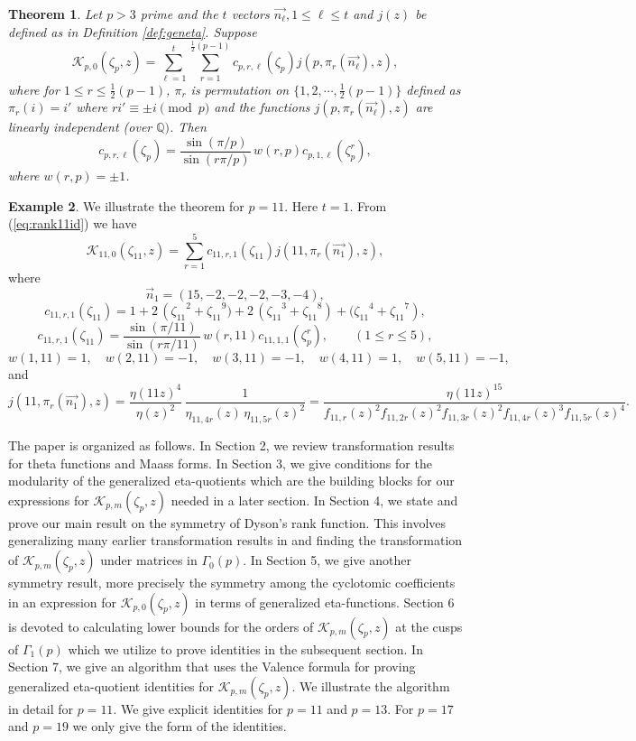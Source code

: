 \documentclass[12pt]{amsart}
\newtheorem{theorem}{Theorem}[section]
\theoremstyle{definition}
\newtheorem{example}[theorem]{Example}
\theoremstyle{remark}
\numberwithin{equation}{section}
\newcommand\eqn[1]{(\ref{eq:#1})}
\newcommand\refdef[1]{\ref{def:#1}}
\begin{document}
\begin{theorem}
\label{thm:Kp0sym}
Let $p>3$ prime and the $t$ vectors $\overrightarrow{n_{\ell}}, 1\leq \ell \leq t$ and $j(z)$ be defined as in Definition \refdef{geneta}. Suppose
$$
\mathcal{K}_{p,0}(\zeta_p,z)
=\sum_{{\ell}=1}^t\sum_{r=1}^{\frac{1}{2}(p-1)}c_{p,r,{\ell}}(\zeta_p)
         j(p,\pi_r(\overrightarrow{n_{\ell}}),z),
$$ 
where for $1\leq r \leq \frac{1}{2}(p-1)$, 
$\pi_r$ is permutation on $\{1,2,\cdots,\frac{1}{2}(p-1)\}$ defined as $\pi_r(i)=i'$ 
where $ri'\equiv \pm i \pmod{p}$ and the functions 
$j(p,\pi_r(\overrightarrow{n_{\ell}}),z)$ are linearly independent (over $\mathbb{Q})$. 
Then
$$
c_{p,r,\ell}(\zeta_p)=\frac{\sin(\pi/p)}{\sin(r\pi/p)}\,w(r,p)c_{p,1,\ell}(\zeta_p^r),
$$ 
where $w(r,p)=\pm 1$. 
\end{theorem}
\begin{example}
\label{ex:Kp0symeg}
We illustrate the theorem for $p=11$. Here $t=1$. From \eqn{rank11id} we have
$$
\mathcal{K}_{11,0}(\zeta_{11},z)
=\sum_{r=1}^{5}c_{11,r,1}(\zeta_{11})
         j(11,\pi_r(\overrightarrow{n_{1}}),z),
$$
where
$$
\vec{n}_1 = (15, -2,-2 ,-2,-3,-4),
$$
$$
c_{11,r,1}(\zeta_{11}) 
= 1+2\,\left({\zeta_{11}}^{2}+{\zeta_{11}}^{9})
  +2\,({\zeta_{11}}^{3}+{\zeta_{11}}^{8})
   +({\zeta_{11}}^{4}+{\zeta_{11}}^{7}\right),
$$
$$
c_{11,r,1}(\zeta_{11})=\frac{\sin(\pi/11)}{\sin(r\pi/11)}\,w(r,11)
                        c_{11,1,1}(\zeta_p^r),\qquad (1 \le r \le 5),
$$ 
$$
w(1,11)=1, \quad
w(2,11)=-1, \quad
w(3,11)=-1, \quad
w(4,11)=1, \quad
w(5,11)=-1,
$$
and
$$
j(11,\pi_r(\overrightarrow{n_{1}}),z)
= \frac{\eta(11z)^4}{\eta(z)^2} \, 
\frac{1}{\eta_{11,4r}(z)\,\eta_{11,5r}(z)^2}=
\frac{\eta(11z)^{15}}
{f_{11,r}(z)^2 
f_{11,2r}(z)^2 
f_{11,3r}(z)^2 
f_{11,4r}(z)^3 
f_{11,5r}(z)^4 }.
$$
\end{example}

The paper is organized as follows. In Section 2, we review transformation  
results for theta functions and Maass forms. In Section 3, we give conditions 
for 
the modularity of the generalized eta-quotients which are the building blocks 
for our 
expressions for $\mathcal{K}_{p,m}(\zeta_{p},z)$ needed in a later section. 
In Section 4, we state and prove our main result on the symmetry of Dyson's 
rank function. This involves generalizing many earlier transformation results 
in \cite{Ga19a} and finding the transformation of 
$\mathcal{K}_{p,m}(\zeta_{p},z)$ under matrices in $\Gamma_0(p)$. In 
Section 5, we give another symmetry result, more precisely the symmetry 
among the cyclotomic coefficients in an expression for 
$\mathcal{K}_{p,0}(\zeta_{p},z)$ in terms of generalized eta-functions.  
Section 6 is devoted to calculating lower bounds for the orders of 
$\mathcal{K}_{p,m}(\zeta_{p},z)$ at the cusps of $\Gamma_1(p)$ which we 
utilize to prove identities in the subsequent section. 
In Section 7, we give an algorithm that uses the Valence formula
for proving generalized eta-quotient identities
for $\mathcal{K}_{p,m}(\zeta_{p},z)$. We illustrate the algorithm in
detail for $p=11$. We give explicit identities for $p=11$ and $p=13$.
For $p=17$ and $p=19$ we only give the form of the identities.
\end{document}
